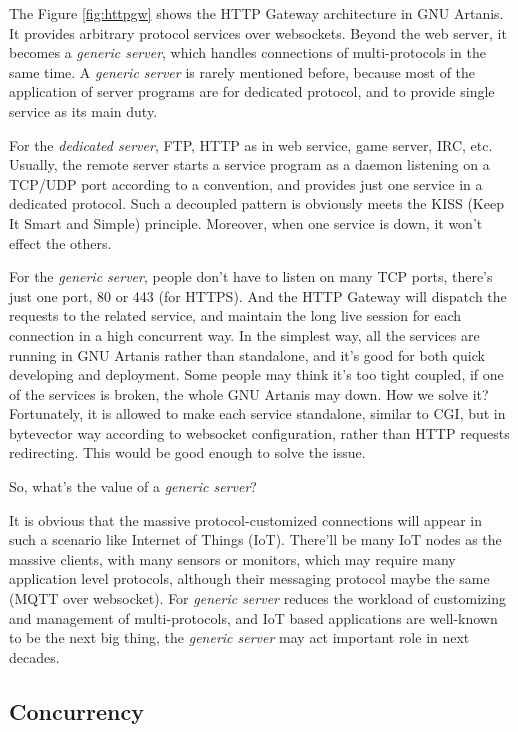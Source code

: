 \documentclass[numbers,numberedpars]{sigplanconf}
\begin{document}
The Figure \ref{fig:httpgw} shows the HTTP Gateway architecture in GNU Artanis.
It provides arbitrary protocol services over websockets. Beyond the web server, it becomes a {\it generic server}, which handles
connections of multi-protocols in the
same time. A {\it generic server} is rarely mentioned before, because most of the application of server programs are for dedicated protocol,
and to provide single service as its main duty.

For the {\it dedicated server}, FTP, HTTP as in web service, game server, IRC, etc. Usually, the remote server starts a service program
as a daemon listening on a TCP/UDP port according to a convention, and provides just one service in a dedicated protocol. Such a decoupled
pattern is obviously meets the KISS (Keep It Smart and Simple) principle. Moreover, when one service is down, it won't effect the others.

For the {\it generic server}, people don't have to listen on many TCP ports, there's just one port, 80 or 443 (for HTTPS). And the HTTP
Gateway will dispatch the requests to the related service, and maintain the long live session for each connection in a high concurrent way.
In the simplest way, all the services are running in GNU Artanis rather than standalone, and it's good for both quick developing and deployment.
Some people may think it's too tight coupled, if one of the services is broken, the whole GNU Artanis may down. How we solve it?
Fortunately, it is allowed to make each service standalone, similar to CGI, but in bytevector way according to websocket configuration, rather than HTTP requests redirecting. This would be good enough to solve the issue.

So, what's the value of a {\it generic server}?

It is obvious that the massive protocol-customized connections will appear in such a scenario like Internet of Things (IoT).
There'll be many IoT nodes as the massive clients, with many sensors or monitors, which may require many application level protocols,
although their messaging protocol maybe the same (MQTT over websocket).
For {\it generic server} reduces the workload of customizing and management of multi-protocols, and IoT based applications are
well-known to be the next big thing, the {\it generic server} may act important role in next decades. 

\subsection{Concurrency} \label{Concurrency}
\end{document}
